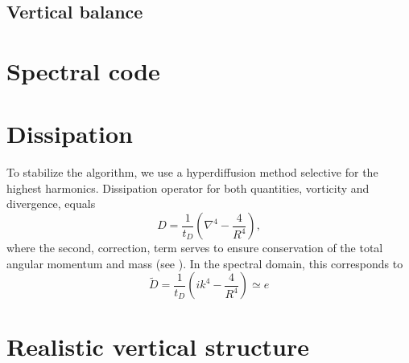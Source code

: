 \documentclass[usenatbib,onecolumn]{mnras}
\begin{document}
\subsection{Vertical balance}

\section{Spectral code}

\section{Dissipation}

To stabilize the algorithm, we use a hyperdiffusion method selective for the
highest harmonics. Dissipation operator for both quantities, vorticity and
divergence, equals
\begin{equation}
\displaystyle  D = \frac{1}{t_{D}}\left(\nabla^4 - \frac{4}{R^4}\right),
\end{equation}
where the second, correction, term serves to ensure conservation of the total
angular momentum and mass (see \citet{swater}). In the spectral domain, this
corresponds to
\begin{equation}
\displaystyle   \tilde{D} = \frac{1}{t_{D}}\left( ik^4 -
\frac{4}{R^4}\right)\simeq e^{}
\end{equation}

\section{Realistic vertical structure}
\end{document}
